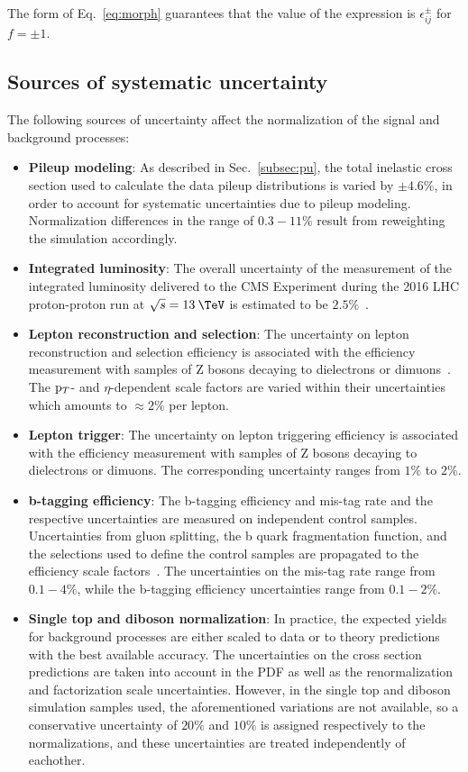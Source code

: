The form of Eq.~\ref{eq:morph} guarantees that the value of the expression is $\epsilon^{\pm}_{ij}$ for $f=\pm 1$. 

\subsection{Sources of systematic uncertainty}

The following sources of uncertainty affect the normalization of the signal and background processes: 

\begin{itemize}
  \item \textbf{Pileup modeling}: As described in Sec.~\ref{subsec:pu}, the total inelastic cross section used to calculate the data pileup distributions is varied by $\pm4.6\%$, in order to account for systematic uncertainties due to pileup modeling. Normalization differences in the range of $0.3-11\%$ result from reweighting the simulation accordingly.
  \item \textbf{Integrated luminosity}: The overall uncertainty of the measurement of the integrated luminosity delivered to the CMS Experiment during the 2016 LHC proton-proton run at $\sqrt{s}=13\:\TeV$ is estimated to be $2.5\%$~\cite{CMS-PAS-LUM-17-001}.
  \item \textbf{Lepton reconstruction and selection}: The uncertainty on lepton reconstruction and selection efficiency is associated with the efficiency measurement with samples of Z bosons decaying to dielectrons or dimuons~\cite{CMS:2011aa}. The ${\mathrm p_{T}}$- and $\eta$-dependent scale factors are varied within their uncertainties which amounts to $\approx 2\%$ per lepton.
  \item \textbf{Lepton trigger}: The uncertainty on lepton triggering efficiency is associated with the efficiency measurement with samples of Z bosons decaying to dielectrons or dimuons. The corresponding uncertainty ranges from $1\%$ to $2\%$.
  \item \textbf{b-tagging efficiency}: The b-tagging efficiency and mis-tag rate and the respective uncertainties are measured on independent control samples. Uncertainties from gluon splitting, the b quark fragmentation function, and the selections used to define the control samples are propagated to the efficiency scale factors~\cite{CMS-PAS-BTV-15-001}. The uncertainties on the mis-tag rate range from $0.1-4\%$, while the b-tagging efficiency uncertainties range from $0.1-2\%$.
  \item \textbf{Single top and diboson normalization}: In practice, the expected yields for background processes are either scaled to data or to theory predictions with the best available accuracy. The uncertainties on the cross section predictions are taken into account in the PDF as well as the renormalization and factorization scale uncertainties. However, in the single top and diboson simulation samples used, the aforementioned variations are not available, so a conservative uncertainty of $20\%$ and $10\%$ is assigned respectively to the normalizations, and these uncertainties are treated independently of eachother.  

\end{itemize}
